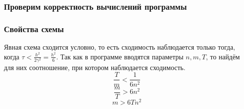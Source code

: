 \documentclass{beamer}
\begin{document}
	\begin{frame}
		\frametitle{Проверим корректность вычислений программы}
		\begin{figure}[h]
		\end{figure}

		\begin{figure}[h]
		\end{figure}
	\end{frame}

	\begin{frame}
		\frametitle{Свойства схемы}
		Явная схема сходится условно, то есть сходимость наблюдается только тогда, когда $\tau < \frac{h^2}{2\gamma^2} = \frac{h^2}{6}$.
		\newline 
		Так как в программе вводятся параметры $n, m, T$, то найдём для них соотношение, при котором наблюдается сходимость.
		\[ \frac{T}{m} < \frac{1}{6n^2} \]
		\[ \frac{m}{T} > 6n^2 \]
		\[ m > 6Tn^2 \]
	\end{frame}
\end{document}
